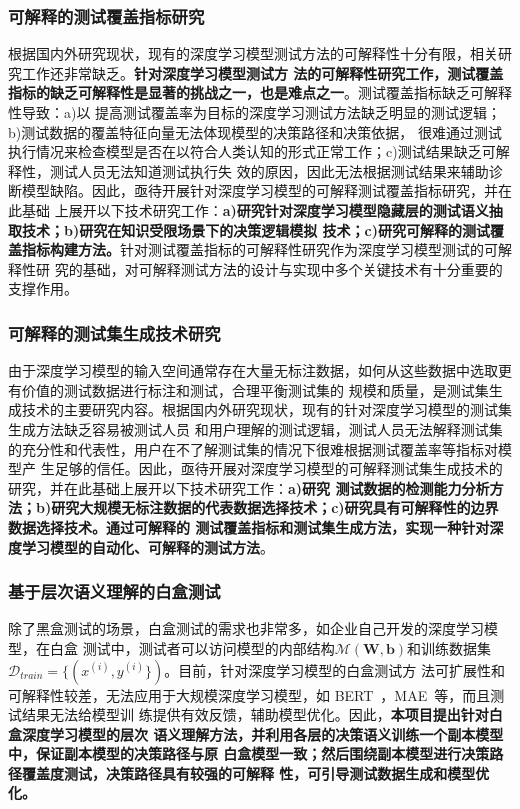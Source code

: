 \subsubsection{可解释的测试覆盖指标研究}
根据国内外研究现状，现有的深度学习模型测试方法的可解释性十分有限，相关研究工作还非常缺乏。\textbf{针对深度学习模型测试方
    法的可解释性研究工作，测试覆盖指标的缺乏可解释性是显著的挑战之一，也是难点之一}。测试覆盖指标缺乏可解释性导致：a)以
提高测试覆盖率为目标的深度学习测试方法缺乏明显的测试逻辑；b)测试数据的覆盖特征向量无法体现模型的决策路径和决策依据，
很难通过测试执行情况来检查模型是否在以符合人类认知的形式正常工作；c)测试结果缺乏可解释性，测试人员无法知道测试执行失
效的原因，因此无法根据测试结果来辅助诊断模型缺陷。因此，亟待开展针对深度学习模型的可解释测试覆盖指标研究，并在此基础
上展开以下技术研究工作：\textbf{a)研究针对深度学习模型隐藏层的测试语义抽取技术；b)研究在知识受限场景下的决策逻辑模拟
    技术；c)研究可解释的测试覆盖指标构建方法。}针对测试覆盖指标的可解释性研究作为深度学习模型测试的可解释性研
究的基础，对可解释测试方法的设计与实现中多个关键技术有十分重要的支撑作用。

\subsubsection{可解释的测试集生成技术研究}
由于深度学习模型的输入空间通常存在大量无标注数据，如何从这些数据中选取更有价值的测试数据进行标注和测试，合理平衡测试集的
规模和质量，是测试集生成技术的主要研究内容。根据国内外研究现状，现有的针对深度学习模型的测试集生成方法缺乏容易被测试人员
和用户理解的测试逻辑，测试人员无法解释测试集的充分性和代表性，用户在不了解测试集的情况下很难根据测试覆盖率等指标对模型产
生足够的信任。因此，亟待开展对深度学习模型的可解释测试集生成技术的研究，并在此基础上展开以下技术研究工作：\textbf{a)研究
    测试数据的检测能力分析方法；b)研究大规模无标注数据的代表数据选择技术；c)研究具有可解释性的边界数据选择技术。通过可解释的
    测试覆盖指标和测试集生成方法，实现一种针对深度学习模型的自动化、可解释的测试方法}。


\subsubsection{基于层次语义理解的白盒测试}

除了黑盒测试的场景，白盒测试的需求也非常多，如企业自己开发的深度学习模型，在白盒
测试中，测试者可以访问模型的内部结构$\mathcal M(\bm W, \bm b)$和训练数据集
$\mathcal D_{train}=\{(x^{(i)}, y^{(i)}\})$。目前，针对深度学习模型的白盒测试方
法可扩展性和可解释性较差，无法应用于大规模深度学习模型，如
BERT~\cite{kenton2019bert}，MAE~\cite{he2021masked}等，而且测试结果无法给模型训
练提供有效反馈，辅助模型优化。因此，\textbf{本项目提出针对白盒深度学习模型的层次
    语义理解方法，并利用各层的决策语义训练一个副本模型中，保证副本模型的决策路径与原
    白盒模型一致；然后围绕副本模型进行决策路径覆盖度测试，决策路径具有较强的可解释
    性，可引导测试数据生成和模型优化。}

